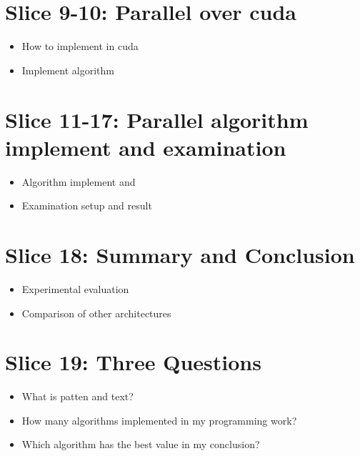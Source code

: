 \documentclass[11pt]{article}       %
\newenvironment{slide}[1]        {\section{#1} \begin{itemize}}%
                                 {\end{itemize}}
\begin{document}
\begin{slide}{Slice 9-10: Parallel over cuda}
\item How to implement in cuda
\item Implement algorithm
\end{slide}

\begin{slide}{Slice 11-17: Parallel algorithm implement and examination }
\item Algorithm implement and
\item Examination setup and result
\end{slide}


\begin{slide}{Slice 18: Summary and Conclusion }
\item Experimental evaluation
\item Comparison of other architectures
\end{slide}

\begin{slide}{Slice 19: Three Questions }
\item What is patten and text?
\item How many algorithms implemented in my programming work?
\item Which algorithm has the best value in my conclusion?
\end{slide}




\end{document}
